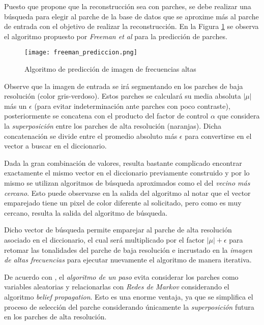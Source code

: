 Puesto que \cite{freeman} propone que la reconstrucción sea con parches, se debe 
realizar una búsqueda para elegir al parche de la base de datos que se aproxime 
más al parche de entrada con el objetivo de realizar la reconstrucción. En la
Figura \ref{fig:fr_prediccion} se observa el algoritmo propuesto por
\emph{Freeman et al} para la predicción de parches.

\begin{figure}[H]
    \texttt{[image:  freeman\_prediccion.png]}
    \centering
    \caption{ Algoritmo de predicción de imagen de frecuencias altas }
    \label{fig:fr_prediccion}
\end{figure}

Observe que la imagen de entrada se irá segmentando en los parches de baja 
resolución (color gris-verdoso). Estos parches se calculará su media absoluta 
$|\mu|$ más un $\epsilon$ (para evitar indeterminación ante parches con poco
contraste), posteriormente se concatena con el producto del factor de control 
$\alpha$ que considera la \emph{superposición} entre los parches de alta resolución
(naranjas). Dicha concatenación se divide entre el promedio absoluto más $\epsilon$
para convertirse en el vector a buscar en el diccionario. 

Dada la gran combinación de valores, resulta bastante complicado encontrar 
exactamente el mismo vector en el diccionario previamente construido y por
lo mismo se utilizan algoritmos de búsqueda aproximados como el del \emph{vecino
más cercano}. Esto puede observarse en la salida del algoritmo al notar que el 
vector emparejado tiene un pixel de color diferente al solicitado, pero como 
es muy cercano, resulta la salida del algoritmo de búsqueda. 

Dicho vector de búsqueda permite emparejar al parche de alta resolución asociado
en el diccionario, el cual será multiplicado por el factor $|\mu|+\epsilon$ para 
retomar las tonalidades del parche de baja resolución e incrustado en la \emph{imagen de altas frecuencias}
para ejecutar nuevamente el algoritmo de manera iterativa.

De acuerdo con \cite{freeman}, el \emph{algoritmo de un paso} evita considerar
los parches como variables aleatorias y relacionarlas con \emph{Redes de Markov}
considerando el algoritmo \emph{belief propagation}. Esto es una enorme ventaja,
ya que se simplifica el proceso de selección del parche considerando 
únicamente la \emph{superposición} futura en los parches de alta resolución. 

